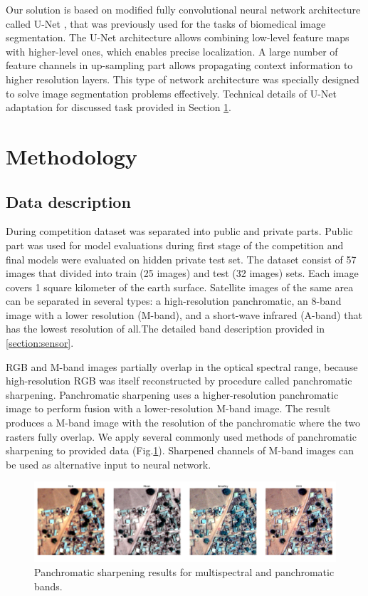 \documentclass[10pt,twocolumn,letterpaper]{article}
\begin{document}
Our solution is based on modified fully convolutional neural network architecture called U-Net  \cite{unet}, that was previously used for the tasks of biomedical image segmentation. The U-Net architecture allows combining low-level feature maps with higher-level ones, which enables precise localization.  A large number of feature channels in up-sampling part allows propagating context information to higher resolution layers.  This type of network architecture was specially designed to solve image segmentation problems effectively. Technical details of U-Net adaptation for discussed task provided in Section \ref{section:methods}.

\section{Methodology}
\label{section:methods}

\subsection{Data description}

During competition dataset was separated into public and private parts. Public part was used for model evaluations during first stage of the competition and final models were evaluated on hidden private test set.
The dataset consist of 57 images that divided into train (25 images) and test (32 images) sets. Each image covers 1 square kilometer of the earth surface. Satellite images of the same area can be separated in several types: a high-resolution panchromatic, an 8-band image with a lower resolution (M-band), and a short-wave infrared (A-band) that has the lowest resolution of all.The detailed band description provided in \ref{section:sensor}. 

RGB and M-band images partially overlap in the optical spectral range, because high-resolution RGB was itself reconstructed by procedure called panchromatic sharpening. Panchromatic sharpening uses a higher-resolution panchromatic image to perform  fusion with a lower-resolution M-band image. The result produces a M-band image with the resolution of the panchromatic  where the two rasters fully overlap. We apply several commonly used methods of panchromatic sharpening \cite{pansharp} to provided data (Fig.\ref{fig:pan}). Sharpened channels of M-band images can be used as alternative input to neural network.    

\begin{figure}[!h]
	\captionsetup{justification=centering}
	\centering
	\includegraphics[scale=0.225]{pansharpen}
	\caption{Panchromatic sharpening results for multispectral and panchromatic bands.}
	\label{fig:pan}
\end{figure}
\end{document}
